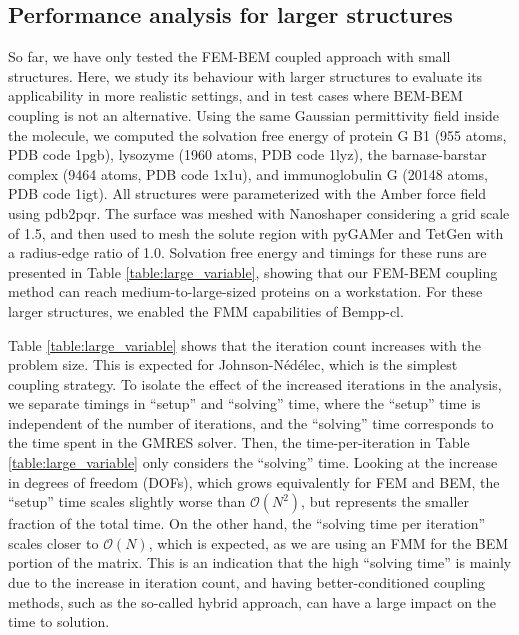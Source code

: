 \subsection*{\sffamily \large Performance analysis for larger structures}

So far, we have only tested the FEM-BEM coupled approach with small structures. Here, we study its behaviour with larger structures to evaluate its applicability in more realistic settings, and in test cases where BEM-BEM coupling is not an alternative. Using the same Gaussian permittivity field inside the molecule, we computed the solvation free energy of protein G B1 (955 atoms, PDB code 1pgb), lysozyme (1960 atoms, PDB code 1lyz), the barnase-barstar complex (9464 atoms, PDB code 1x1u), and immunoglobulin G (20148 atoms, PDB code 1igt). All structures were parameterized with the Amber\cite{Swanson05} force field using pdb2pqr.\cite{Dolinsky04} The surface was meshed with Nanoshaper\cite{decherchi2013general} considering a grid scale of 1.5, and then used to mesh the solute region with pyGAMer\cite{lee2020open} and TetGen\cite{hang2015tetgen} with a radius-edge ratio of 1.0. Solvation free energy and timings for these runs are presented in Table \ref{table:large_variable}, showing that our FEM-BEM coupling method can reach medium-to-large-sized proteins on a workstation. For these larger structures, we enabled the FMM capabilities of Bempp-cl.

Table \ref{table:large_variable} shows that the iteration count increases with the problem size. This is expected for Johnson-N\'ed\'elec, which is the simplest coupling strategy. To isolate the effect of the increased iterations in the analysis, we separate timings in ``setup'' and ``solving'' time, where the ``setup'' time is independent of the number of iterations, and the ``solving'' time corresponds to the time spent in the GMRES solver. Then, the time-per-iteration in Table \ref{table:large_variable} only considers the ``solving'' time. Looking at the increase in degrees of freedom (DOFs), which grows equivalently for FEM and BEM, the ``setup'' time scales slightly worse than $\mathcal{O}(N^2)$, but represents the smaller fraction of the total time. On the other hand, the ``solving time per iteration'' scales closer to $\mathcal{O}(N)$, which is expected, as we are using an FMM for the BEM portion of the matrix. This is an indication that the high ``solving time'' is mainly due to the increase in iteration count, and having better-conditioned coupling methods, such as the so-called hybrid approach,\cite{betcke2022hybrid} can have a large impact on the time to solution.

